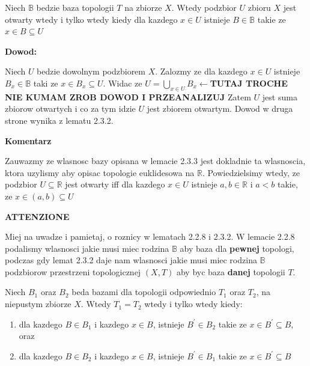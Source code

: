 \documentclass{article}
\begin{document}
\begin{tcolorbox}[colback=white!90!green,colframe=black!35!green,title=2.3.3 Lemat: Baza topologii podejscie 3?]

    Niech $\mathbb{B}$ bedzie baza topologii $T$ na zbiorze $X$. Wtedy podzbior $U$ zbioru $X$ jest otwarty wtedy i tylko wtedy kiedy dla kazdego $x \in U$ istnieje $B \in \mathbb{B}$ takie ze $x \in B \subseteq U$

\end{tcolorbox}
 
\textbf{Dowod:}

Niech $U$ bedzie dowolnym podzbiorem $X$. Zalozmy ze dla kazdego $x \in U$ istnieje $B_{x} \in \mathbb{B}$ taki ze $x \in B_{x} \subseteq U$. Widac ze $U = \bigcup\limits_{x \in U}B_{x}\leftarrow$\textbf{TUTAJ TROCHE NIE KUMAM ZROB DOWOD I PRZEANALIZUJ} Zatem $U$ jest suma zbiorow otwartych i co za tym idzie $U$ jest zbiorem otwartym. Dowod w druga strone wynika z lematu 2.3.2.

\textbf{Komentarz}

Zauwazmy ze wlasnosc bazy opisana w lemacie 2.3.3 jest dokladnie ta wlasnoscia, ktora uzylismy aby opisac topologie euklidesowa na $\mathbb{R}$. Powiedzielsimy wtedy, ze podzbior $U \subseteq \mathbb{R}$ jest otwarty iff dla kazdego $x \in U$ istnieje $a,b \in \mathbb{R}$ i $a<b$ takie, ze $x \in (a,b) \subseteq U$

\textbf{ATTENZIONE}

Miej na uwadze i pamietaj, o roznicy w lematach 2.2.8 i 2.3.2. W lemacie 2.2.8 podalismy wlasnosci jakie musi miec rodzina $\mathbb{B}$ aby baza dla \textbf{pewnej} topologi, podczas gdy lemat 2.3.2 daje nam wlasnosci jakie musi miec rodzina $\mathbb{B}$ podzbiorow przestrzeni topologicznej $(X,T)$ aby byc baza \textbf{danej} topologii $T$.

\begin{tcolorbox}[colback=white!90!green,colframe=black!35!green,title=2.3.4 Lemat: Bazy dla tej samej topologii]
    Niech $B_{1}$ oraz $B_{2}$ beda bazami dla topologii odpowiednio $T_{1}$ oraz $T_{2}$, na niepustym zbiorze $X$. Wtedy $T_{1} = T_{2}$ wtedy i tylko wtedy kiedy:
    \begin{enumerate}[label=(\alph*)]
        \item dla kazdego $B \in B_{1}$ i kazdego $x \in B$, istnieje $B^{\prime} \in B_{2}$ takie ze $x \in B^{\prime} \subseteq B$, oraz
        \item dla kazdego $B \in B_{2}$ i kazdego $x \in B$, istnieje $B^{\prime} \in B_{1}$ takie ze $x \in B^{\prime} \subseteq B$
    \end{enumerate}
\end{tcolorbox}
\end{document}
